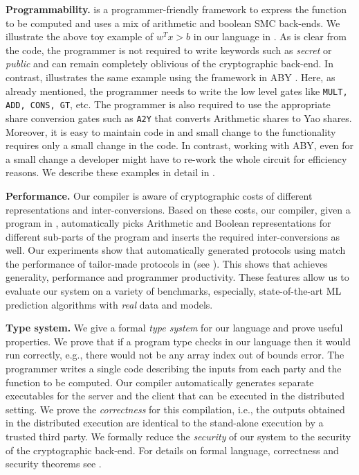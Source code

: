 \textbf{Programmability.} \tool is a programmer-friendly framework to
express the function to be computed and uses a mix of arithmetic and
boolean SMC back-ends. We illustrate the above toy example of $w^Tx
>b$ in our language in . As is clear from the code,
the programmer is not required to write keywords such as {\em secret}
or {\em public} and can remain completely oblivious of the
cryptographic back-end. In contrast,  illustrates
the same example using the framework in ABY \cite{aby}. Here, as
already mentioned, the programmer needs to write the low level gates
like {\tt MULT, ADD, CONS, GT}, etc. The programmer is also required
to use the appropriate share conversion gates such as {\tt A2Y} that
converts Arithmetic shares to Yao shares. Moreover, it is easy to
maintain code in \tool and small change to the functionality requires
only a small change in the code. In contrast, working with ABY, even
for a small change a developer might have to re-work the whole circuit
for efficiency reasons. We describe these examples in detail in
.

\textbf{Performance.} Our compiler is aware of cryptographic costs of different representations and inter-conversions.  Based on these costs, our compiler, given a program in \tool, automatically picks Arithmetic and Boolean representations for different sub-parts of the program and inserts the required inter-conversions as well. 
Our experiments show that automatically generated protocols using \tool match the performance of tailor-made protocols in \cite{minionn,shafindss} (see ). This shows that  \tool achieves generality, performance and programmer productivity. These features allow us to evaluate our system on a variety of benchmarks, especially, state-of-the-art ML prediction algorithms with \emph{real} data and models. 

\textbf{Type system.} We give a formal {\em type system} for our language and prove useful properties. We prove that if a program type checks in our language then it would run correctly, e.g., there would not be any array index out of bounds error. The programmer writes a single code describing the inputs from each party and the function to be computed. Our compiler automatically generates separate executables for the server and the client that can be executed in the distributed setting. We prove the {\em correctness} for this compilation, i.e., the outputs obtained in the distributed execution are identical to the stand-alone execution by a trusted third party. We formally reduce the {\em security} of our system to the security of the cryptographic back-end. For details on formal language, correctness and security theorems see .


